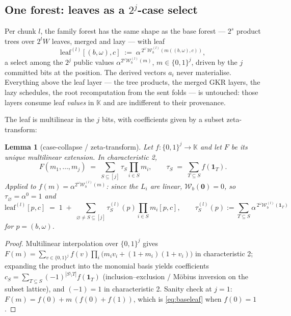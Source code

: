 \documentclass[11pt]{article}
\newcommand{\K}{\mathbb{K}}            %
\newcommand{\bits}{\{0,1\}}
\newcommand{\Wc}{\mathcal{W}}          %
\theoremstyle{plain}
\newtheorem{lemma}[theorem]{Lemma}
\theoremstyle{definition}
\theoremstyle{remark}
\begin{document}
\subsection{One forest: leaves as a \texorpdfstring{$2^{j}$}{2\^{}j}-case select}\label{sec:leaves}

Per chunk $l$, the family forest has the same shape as the base forest ---
$2^{s}$ product trees over $2^{t}W$ leaves, merged and lazy --- with leaf
\begin{equation}\label{eq:familyleaf}
  \mathrm{leaf}^{(l)}[(b,\omega),c]
  \;:=\; \alpha^{\,2^{\omega}\,\Wc^{(l)}_b(m((b,\omega),c))} ,
\end{equation}
a select among the $2^{j}$ public values
$\alpha^{2^{\omega}\Wc^{(l)}_b(m)}$, $m\in\bits^{j}$, driven by the $j$
committed bits at the position. The derived vectors $a_i$ never materialise.
Everything above the leaf layer --- the tree products, the merged GKR layers,
the lazy schedules, the root recomputation from the sent folds --- is
untouched: those layers consume leaf \emph{values} in $\K$ and are indifferent
to their provenance.

The leaf is multilinear in the $j$ bits, with coefficients given by a subset
zeta-transform:

\begin{lemma}[case-collapse / zeta-transform]\label{lem:zeta}
Let $f:\bits^{j}\to\K$ and let $F$ be its unique multilinear extension. In
characteristic 2,
\[
  F(m_1,\dots,m_j) \;=\; \sum_{S\subseteq[j]} \tau_S \prod_{i\in S} m_i,
  \qquad
  \tau_S \;=\; \sum_{T\subseteq S} f(\mathbf{1}_T).
\]
Applied to $f(m)=\alpha^{2^{\omega}\Wc^{(l)}_b(m)}$: since the $L_i$ are
linear, $\Wc_b(\mathbf 0)=0$, so $\tau_\varnothing=\alpha^{0}=1$ and
\begin{equation}\label{eq:leafzeta}
  \mathrm{leaf}^{(l)}[p,c] \;=\;
  1 \;+\; \sum_{\varnothing\ne S\subseteq[j]} \tau^{(l)}_S(p)
          \prod_{i\in S} m_i[p,c],
  \qquad
  \tau^{(l)}_S(p) := \sum_{T\subseteq S}
     \alpha^{\,2^{\omega}\Wc^{(l)}_b(\mathbf{1}_T)}
\end{equation}
for $p=(b,\omega)$.
\end{lemma}

\begin{proof}
Multilinear interpolation over $\bits^{j}$ gives
$F(m)=\sum_{v\in\bits^{j}} f(v)\prod_i\bigl(m_iv_i+(1+m_i)(1+v_i)\bigr)$ in
characteristic 2; expanding the product into the monomial basis yields
coefficients $c_S=\sum_{T\subseteq S}(-1)^{|S\setminus T|}f(\mathbf 1_T)$
(inclusion--exclusion / M\"obius inversion on the subset lattice), and
$(-1)=1$ in characteristic 2. Sanity check at $j=1$:
$F(m)=f(0)+m\,(f(0)+f(1))$, which is \eqref{eq:baseleaf} when
$f(0)=1$.
\end{proof}
\end{document}
